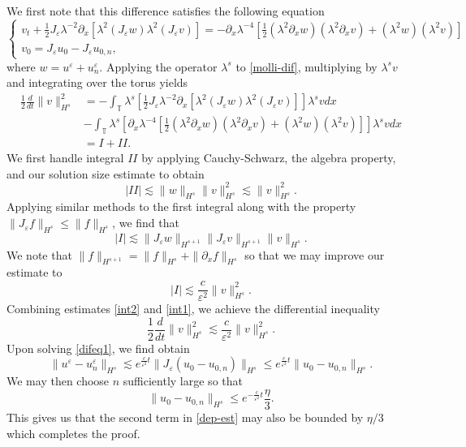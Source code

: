 \documentclass[reqno]{amsart}
\theoremstyle{plain}
\numberwithin{equation}{section}
\newcommand{\p}{\partial}
\newcommand{\ci}{\mathbb{T}}
\newcommand{\ee}{\varepsilon}
\begin{document}
We first note that this difference satisfies the following equation
\begin{equation}\label{molli-dif}
    \begin{cases}
v_t+\frac12J_\ee\lambda^{-2}\p_x\left[\lambda^2 (J_\ee w)\lambda^2(J_\ee v)\right] = -\p_x\lambda^{-4}\left[\frac12(\lambda ^2\p_x w)(\lambda ^2\p_x v)+(\lambda^2 w)(\lambda^2 v)\right] \\ 
        v_0 = J_\ee u_0-J_\ee u_{0,n},
    \end{cases}
\end{equation}
where $w = u^\ee+u_n^\ee$.
%
Applying the operator $\lambda^s$ to \eqref{molli-dif}, multiplying by $\lambda^sv$ and integrating over the torus yields
\begin{align}
    \frac12\frac{d}{dt}\|v\|_{H^s}^2 &= -\int_{\ci}\lambda^s\left[\frac12J_\ee \lambda^{-2}\p_x\left[\lambda ^2(J_\ee w)\lambda^2(J_\ee v)\right]\right]\lambda^sv dx \nonumber \\ 
    &- \int_{\ci}\lambda^s\left[\p_x\lambda^{-4}\left[\frac12(\lambda ^2\p_x w)(\lambda^2 \p_x v)+(\lambda ^2w)(\lambda ^2v)\right]\right]\lambda^s v dx \nonumber \\
    &=I+II.
\end{align}
We first handle integral $II$ by applying Cauchy-Schwarz, the algebra property, and our solution size estimate to obtain
\begin{equation}\label{int2}
    |II| \lesssim \|w\|_{H^s}\|v\|_{H^s}^2 \lesssim \|v\|_{H^s}^2.
\end{equation}
Applying similar methods to the first integral along with the property $\|J_\ee f\|_{H^s} \leq \|f\|_{H^s}$, we find that
\begin{equation}
    |I| \lesssim \|J_\ee w\|_{H^{s+1}}\|J_\ee v\|_{H^{s+1}}\|v\|_{H^s}.
\end{equation}
We note that $\|f\|_{H^{s+1}} = \|f\|_{H^s}+\|\p_xf\|_{H^s}$ so that we may improve our estimate to 
\begin{equation}\label{int1}
    |I| \lesssim \frac{c}{\ee^2}\|v\|_{H^s}^2.
\end{equation}
Combining estimates \eqref{int2} and \eqref{int1}, we achieve the differential inequality
\begin{equation}\label{difeq1}
    \frac12\frac{d}{dt}\|v\|_{H^s}^2 \lesssim \frac{c}{\ee^2}\|v\|_{H^s}^2.
\end{equation}
Upon solving \eqref{difeq1}, we find obtain
\begin{equation}
    \|u^\ee - u_n^\ee\|_{H^s} \lesssim e^{\frac{c}{\ee^2}t}\|J_\ee(u_0 - u_{0,n})\|_{H^s} \leq e^{\frac{c}{\ee^2}t}\|u_0 - u_{0,n}\|_{H^s}.
\end{equation}
We may then choose $n$ sufficiently large so that 
\begin{equation}
    \|u_0 - u_{0,n}\|_{H^s} \leq e^{-\frac{c}{\ee^2}t}\frac{\eta}{3}.
\end{equation}
This gives us that the second term in \eqref{dep-est} may also be bounded by $\eta/3$ which completes the proof.
\end{document}
